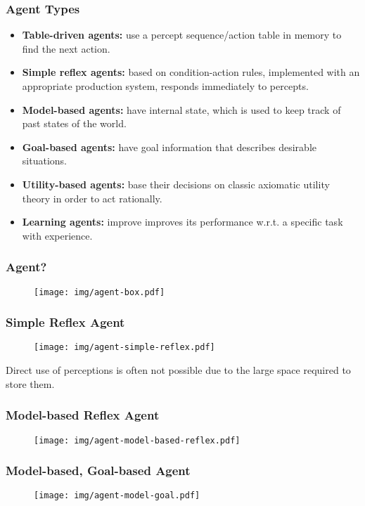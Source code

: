 \documentclass[UTF8,11pt,colorlinks,compress,openany]{beamer}%
\begin{document}
\begin{frame}\frametitle{Agent Types}
\begin{itemize}
	\item \textbf{Table-driven agents:} use a percept sequence/action table in memory to find the next action.
	\item \textbf{Simple reflex agents:} based on condition-action rules, implemented with an appropriate production system, responds immediately to percepts.
	\item \textbf{Model-based agents:} have internal state, which is used to keep track of past states of the world.
	\item \textbf{Goal-based agents:} have goal information that describes desirable situations.
	\item \textbf{Utility-based agents:} base their decisions on classic axiomatic utility theory in order to act rationally.
	\item \textbf{Learning agents:} improve improves its performance w.r.t. a specific task with experience.
\end{itemize}
\end{frame}

\begin{frame}\frametitle{Agent?}
\begin{figure}[H]
	\texttt{[image: img/agent-box.pdf]}
\end{figure}
\end{frame}

\begin{frame}\frametitle{Simple Reflex Agent}
\begin{figure}[H]
	\texttt{[image: img/agent-simple-reflex.pdf]}
\end{figure}
Direct use of perceptions is often not possible due to the large space required to store them.
\end{frame}

\begin{frame}\frametitle{Model-based Reflex Agent}
\begin{figure}[H]
	\texttt{[image: img/agent-model-based-reflex.pdf]}
\end{figure}
\end{frame}

\begin{frame}\frametitle{Model-based, Goal-based Agent}
\begin{figure}[H]
	\texttt{[image: img/agent-model-goal.pdf]}
\end{figure}
\end{frame}
\end{document}
